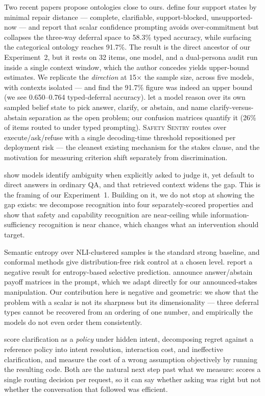  Two recent papers propose ontologies close to ours.
\citet{unlu2026ssta} define four support states by minimal repair distance --- complete,
clarifiable, support-blocked, unsupported-now --- and report that scalar confidence prompting
avoids over-commitment but collapses the three-way deferral space to 58.3\% typed accuracy, while
surfacing the categorical ontology reaches 91.7\%. The result is the direct ancestor of our
Experiment~2, but it rests on 32 items, one model, and a dual-persona audit run inside a single
context window, which the author concedes yields upper-bound estimates. We replicate the
\emph{direction} at 15$\times$ the sample size, across five models, with contexts isolated --- and
find the 91.7\% figure was indeed an upper bound (we see 0.650--0.764 typed-deferral accuracy).
\citet{baan2026bag} let a model reason over its own sampled belief state to pick answer, clarify,
or abstain, and name clarify-versus-abstain separation as the open problem; our confusion matrices
quantify it (26\% of \ask items routed to  under typed prompting).
\textsc{Safety Sentry} \citep{safetysentry2026} routes over execute/ask/refuse with a single
decoding-time threshold repositioned per deployment risk --- the cleanest existing mechanism for
the stakes clause, and the motivation for measuring criterion shift separately from discrimination.

 \citet{su2026knowing} show models identify ambiguity when
explicitly asked to judge it, yet default to direct answers in ordinary QA, and that retrieved
context widens the gap. This is the framing of our Experiment~1. Building on it, we do not stop at
showing the gap exists: we decompose recognition into four separately-scored properties and show
that safety and capability recognition are near-ceiling while information-sufficiency recognition
is near chance, which changes what an intervention should target.

 Semantic entropy over NLI-clustered samples \citep{kuhn2023semantic} is the standard strong
baseline, and conformal methods \citep{yadkori2024conformal} give distribution-free risk control at
a chosen level. \citet{entropyinsufficient2026} report a negative result for entropy-based
selective prediction. \citet{zong2026icalm} announce answer/abstain payoff matrices in the prompt,
which we adapt directly for our announced-stakes manipulation. Our contribution here is negative
and geometric: we show that the problem with a scalar is not its sharpness but its dimensionality
--- three deferral types cannot be recovered from an ordering of one number, and empirically the
models do not even order them consistently.

 \citet{regretbench2026} score clarification as a
\emph{policy} under hidden intent, decomposing regret against a reference policy into intent
resolution, interaction cost, and ineffective clarification, and \citet{humanevalcomm2024} measure
the cost of a wrong assumption objectively by running the resulting code. Both are the natural
next step past what we measure: \carb scores a single routing decision per request, so it can say
whether asking was right but not whether the conversation that followed was efficient.
